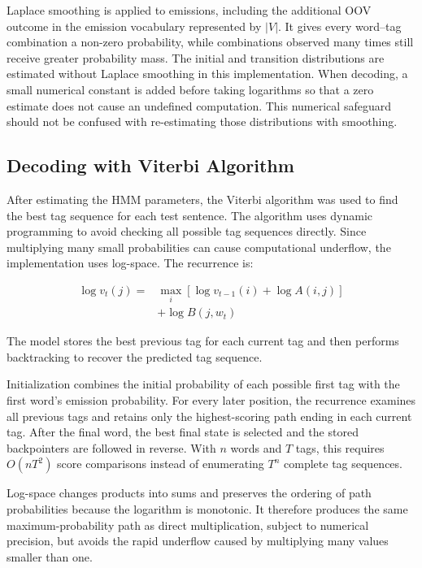 \documentclass[12pt,a4paper]{article}
\begin{document}
Laplace smoothing is applied to emissions, including the additional OOV
outcome in the emission vocabulary represented by $|V|$. It gives every
word--tag combination a non-zero probability, while combinations observed many
times still receive greater probability mass. The initial and transition
distributions are estimated without Laplace smoothing in this implementation.
When decoding, a small numerical constant is added before taking logarithms so
that a zero estimate does not cause an undefined computation. This numerical
safeguard should not be confused with re-estimating those distributions with
smoothing.

\subsection{Decoding with Viterbi Algorithm}

After estimating the HMM parameters, the Viterbi algorithm was used to find the
best tag sequence for each test sentence. The algorithm uses dynamic programming
to avoid checking all possible tag sequences directly. Since multiplying many
small probabilities can cause computational underflow, the implementation uses
log-space. The recurrence is:

\begin{equation}
\begin{aligned}
\log v_t(j) ={} &\max_i \left[\log v_{t-1}(i)
                    + \log A(i,j)\right] \\
                  &+ \log B(j,w_t)
\end{aligned}
\end{equation}

The model stores the best previous tag for each current tag and then performs
backtracking to recover the predicted tag sequence.

Initialization combines the initial probability of each possible first tag with
the first word's emission probability. For every later position, the recurrence
examines all previous tags and retains only the highest-scoring path ending in
each current tag. After the final word, the best final state is selected and the
stored backpointers are followed in reverse. With $n$ words and $T$ tags, this
requires $O(nT^2)$ score comparisons instead of enumerating $T^n$ complete tag
sequences.

Log-space changes products into sums and preserves the ordering of path
probabilities because the logarithm is monotonic. It therefore produces the same
maximum-probability path as direct multiplication, subject to numerical
precision, but avoids the rapid underflow caused by multiplying many values
smaller than one.
\end{document}
